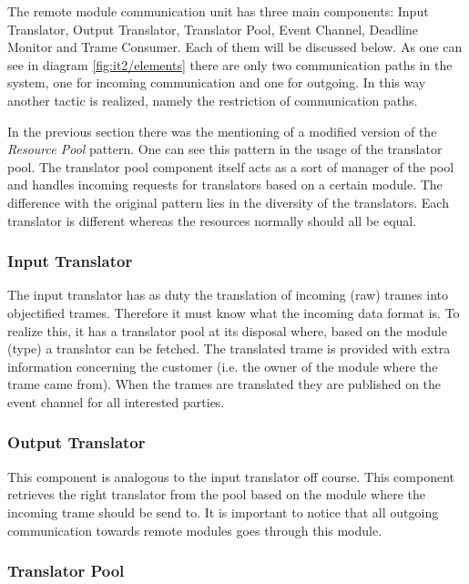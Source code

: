 \npar The remote module communication unit has three main components: Input
Translator, Output Translator, Translator Pool, Event Channel, Deadline Monitor
and Trame Consumer. Each of them will be discussed below. As one can see in
diagram \ref{fig:it2/elements} there are only two communication paths
in the system, one for incoming communication and one for outgoing. In this way
another tactic is realized, namely the restriction of communication paths.

\npar In the previous section there was the mentioning of a modified version of
the \emph{Resource Pool} pattern. One can see this pattern in the usage of the
translator pool. The translator pool component itself acts as a sort of manager
of the pool and handles incoming requests for translators based on a
certain module. The difference with the original pattern lies in the 
diversity of the translators. Each translator is different whereas the
resources normally should all be equal. 

\subsubsection{Input Translator}

\npar The input translator has as duty the translation of incoming (raw) trames
into objectified trames. Therefore it must know what the incoming data format
is. To realize this, it has a translator pool at its disposal where, based on
the module (type) a translator can be fetched. The translated trame is provided
with extra information concerning the customer (i.e. the owner of the module where the
trame came from). When the trames are translated they are published on the event
channel for all interested parties.

\subsubsection{Output Translator}

\npar This component is analogous to the input translator off course. This
component retrieves the right translator from the pool based on the module
where the incoming trame should be send to. It is important to notice that all
outgoing communication towards remote modules goes through this module.

\subsubsection{Translator Pool}

